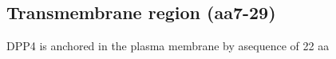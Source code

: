 \subsection{Transmembrane region (aa7-29)}

DPP4 is anchored in the plasma membrane by asequence of 22 aa
